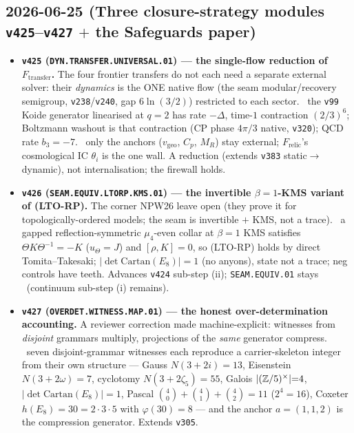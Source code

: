 \subsection*{2026-06-25 (Three closure-strategy modules \texttt{v425}--\texttt{v427} $+$ the Safeguards paper)}
\begin{itemize}
\item \textbf{\texttt{v425} (\texttt{DYN.TRANSFER.UNIVERSAL.01}) --- the single-flow reduction of
$F_{\mathrm{transfer}}$.} The four frontier transfers do not each need a separate external solver: their
\emph{dynamics} is the ONE native flow (the seam modular/recovery semigroup, \texttt{v238}/\texttt{v240},
gap $6\ln(3/2)$) restricted to each sector. \mE\ the \texttt{v99} Koide generator linearised at $q{=}2$ has
rate $-\Delta$, time-$1$ contraction $(2/3)^6$; Boltzmann washout is that contraction (CP phase $4\pi/3$
native, \texttt{v320}); QCD rate $b_3{=}-7$. \mC\ only the anchors ($v_{\mathrm{geo}}$, $C_p$, $M_R$) stay
external; $F_{\mathrm{relic}}$'s cosmological IC $\theta_i$ is the one wall. A reduction (extends
\texttt{v383} static$\to$dynamic), not internalisation; the firewall holds.
\item \textbf{\texttt{v426} (\texttt{SEAM.EQUIV.LTORP.KMS.01}) --- the invertible $\beta{=}1$-KMS variant of
(LTO-RP).} The corner NPW26 leave open (they prove it for topologically-ordered models; the seam is
invertible $+$ KMS, not a trace). \mE\ a gapped reflection-symmetric $\mu_4$-even collar at $\beta{=}1$ KMS
satisfies $\Theta K\Theta^{-1}{=}{-}K$ ($u_\Theta{=}J$) and $[\rho,K]{=}0$, so (LTO-RP) holds by direct
Tomita--Takesaki; $|\!\det\mathrm{Cartan}(E_8)|{=}1$ (no anyons), state not a trace; neg controls have
teeth. Advances \texttt{v424} sub-step (ii); \texttt{SEAM.EQUIV.01} stays \mO\ (continuum sub-step (i)
remains).
\item \textbf{\texttt{v427} (\texttt{OVERDET.WITNESS.MAP.01}) --- the honest over-determination accounting.}
A reviewer correction made machine-explicit: witnesses from \emph{disjoint} grammars multiply, projections
of the \emph{same} generator compress. \mE\ seven disjoint-grammar witnesses each reproduce a
carrier-skeleton integer from their own structure --- Gauss $N(3{+}2i){=}13$, Eisenstein $N(3{+}2\omega){=}7$,
cyclotomy $N(3{+}2\zeta_5){=}55$, Galois $|(\mathbb{Z}/5)^\times|{=}4$, $|\!\det\mathrm{Cartan}(E_8)|{=}1$, Pascal
$\binom40{+}\binom41{+}\binom42{=}11$ ($2^4{=}16$), Coxeter $h(E_8){=}30{=}2{\cdot}3{\cdot}5$ with
$\varphi(30){=}8$ --- and the anchor $a{=}(1,1,2)$ is the compression generator. Extends \texttt{v305}.

\end{itemize}
